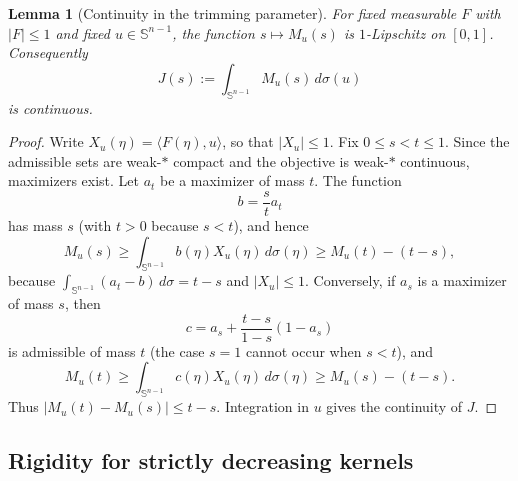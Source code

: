 \documentclass[11pt,reqno]{amsart}
\newtheorem{lemma}[theorem]{Lemma}
\theoremstyle{remark}
\begin{document}
\begin{lemma}[Continuity in the trimming parameter]\label{lem:M-continuous}
For fixed measurable $F$ with $|F|\le1$ and fixed
$u\in\mathbb S^{n-1}$, the function $s\mapsto M_u(s)$ is
$1$-Lipschitz on $[0,1]$.  Consequently
\[
 J(s):=\int_{\mathbb S^{n-1}}M_u(s)\,d\sigma(u)
\]
is continuous.
\end{lemma}

\begin{proof}
Write $X_u(\eta)=\langle F(\eta),u\rangle$, so that $|X_u|\le1$.
Fix $0\le s<t\le1$.  Since the admissible sets are weak-$*$ compact and
the objective is weak-$*$ continuous, maximizers exist.  Let $a_t$ be a
maximizer of mass $t$.  The function
\[
 b=\frac{s}{t}a_t
\]
has mass $s$ (with $t>0$ because $s<t$), and hence
\[
 M_u(s)
 \ge \int_{\mathbb S^{n-1}} b(\eta)X_u(\eta)\,d\sigma(\eta)
 \ge M_u(t)-(t-s),
\]
because $\int_{\mathbb S^{n-1}}(a_t-b)\,d\sigma=t-s$ and $|X_u|\le1$.
Conversely, if $a_s$ is a maximizer of mass $s$, then
\[
 c=a_s+\frac{t-s}{1-s}(1-a_s)
\]
is admissible of mass $t$ (the case $s=1$ cannot occur when $s<t$), and
\[
 M_u(t)
 \ge \int_{\mathbb S^{n-1}} c(\eta)X_u(\eta)\,d\sigma(\eta)
 \ge M_u(s)-(t-s).
\]
Thus $|M_u(t)-M_u(s)|\le t-s$.  Integration in $u$ gives the continuity of
$J$.
\end{proof}


\subsection{Rigidity for strictly decreasing kernels}
\end{document}
